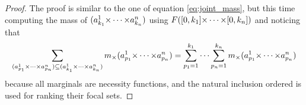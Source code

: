 \begin{proof}
    The proof is similar to the one of equation \eqref{eq:joint_mass}, but this time computing the mass of $(a_{k_1}^1{\times\dots\times} a_{k_n}^n)$ using $F([0,k_1]{\times\dots\times}[0,k_n])$ and noticing that \begin{eqnarray*}
        \sum_{(a^1_{p_1}{\times\dots\times} a^n_{p_n})\subseteq(a^1_{k_1}{\times\dots\times} a^n_{k_n})}m_\times(a^1_{p_1}{\times\dots\times} a^n_{p_n})=\sum_{p_1=1}^{k_1}\dots\sum_{p_n=1}^{k_n} m_\times(a^1_{p_1}{\times\dots\times} a^n_{p_n})
    \end{eqnarray*} because all marginals are necessity functions, and the natural inclusion ordered is used for ranking their focal sets.
\end{proof}

